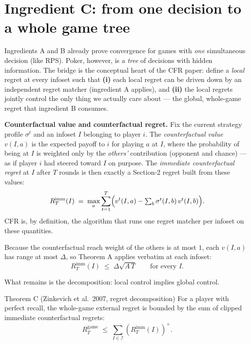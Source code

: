 \documentclass[11pt,a4paper]{article}
\newcommand{\pos}[1]{\left(#1\right)^{\!+}}
\begin{document}
\section{Ingredient C: from one decision to a whole game tree}

Ingredients A and B already prove convergence for games with \emph{one}
simultaneous decision (like RPS). Poker, however, is a \emph{tree} of
decisions with hidden information. The bridge is the conceptual heart of the
CFR paper: define a \emph{local} regret at every infoset such that
\textbf{(i)} each local regret can be driven down by an independent regret
matcher (ingredient A applies), and \textbf{(ii)} the local regrets jointly
control the only thing we actually care about --- the global, whole-game
regret that ingredient B consumes.

\begin{defbox}
\textbf{Counterfactual value and counterfactual regret.} Fix the current
strategy profile $\sigma^t$ and an infoset $I$ belonging to player $i$. The
\emph{counterfactual value} $v(I, a)$ is the expected payoff to $i$ for
playing $a$ at $I$, where the probability of being at $I$ is weighted only by
the \emph{others'} contribution (opponent and chance) --- as if player $i$
had steered toward $I$ on purpose. The \emph{immediate counterfactual
regret} at $I$ after $T$ rounds is then exactly a Section-2 regret built from
these values:
\[
R_T^{\mathrm{imm}}(I) \;=\; \max_a \sum_{t=1}^{T}
\Bigl( v^t(I,a) - \textstyle\sum_b \sigma^t(I,b)\, v^t(I,b) \Bigr).
\]
CFR is, by definition, the algorithm that runs one regret matcher per infoset
on these quantities.
\end{defbox}

Because the counterfactual reach weight of the others is at most $1$, each
$v(I,a)$ has range at most $\Delta$, so Theorem A applies verbatim at each
infoset:
\[
R_T^{\mathrm{imm}}(I) \;\le\; \Delta\sqrt{A\,T}
\qquad \text{for every } I . \tag{A applied locally}
\]

What remains is the decomposition: local control implies global control.

\begin{thmbox}{Theorem C (Zinkevich et al.\ 2007, regret decomposition)}
For a player with perfect recall, the whole-game external regret is bounded
by the sum of clipped immediate counterfactual regrets:
\[
R_T^{\mathrm{game}} \;\le\; \sum_{I \in \mathcal{I}}
\pos{R_T^{\mathrm{imm}}(I)} .
\]
\end{thmbox}
\end{document}
